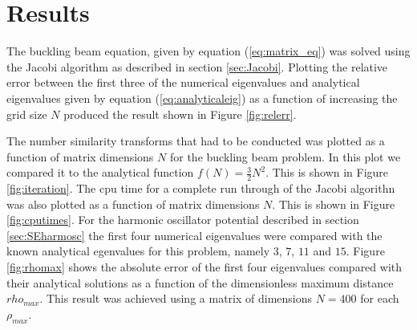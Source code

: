 \documentclass[twocolumn]{aastex62}
\begin{document}
\section{Results} \label{sec:results}
The buckling beam equation, given by equation (\ref{eq:matrix_eq}) was solved using the Jacobi algorithm as described in section \ref{sec:Jacobi}. Plotting the relative error between the first three of the numerical eigenvalues and analytical eigenvalues given by equation (\ref{eq:analyticaleig}) as a function of increasing the grid size $N$ produced the result shown in Figure \ref{fig:relerr}.
\begin{figure*}[h]
	\caption{Figure showing the relative error between the numerical and analytical eigenvalues given by equation \ref{eq:analyticaleig} for the buckling beam problem given by \ref{eq:matrix_eq}. }
	\label{fig:relerr}
\end{figure*}
\begin{figure*}[h]
	\caption{Figure showing the number of similarity transforms conducted before the off-diagonal elements are set below a tolerance when solving the buckling beam problem using the Jacobi algorithm.}
	\label{fig:iteration}
\end{figure*}
\begin{figure*}[h]
	\caption{Figure showing the CPU time as a function of matrix dimension $N$ when solving the buckling beam problem with the jacobi algorithm. The data is compared with the analytical function $f(N)=\frac{3}{2}N^2$.}
	\label{fig:cputimes}
\end{figure*}
The number similarity transforms that had to be conducted was plotted as a function of matrix dimensions $N$ for the buckling beam problem. In this plot we compared it to the analytical function $f(N)=\frac{3}{2}N^2$. This is shown in Figure \ref{fig:iteration}. The cpu time for a complete run through of the Jacobi algorithn was also plotted as a function of matrix dimensions $N$.  This is shown in Figure \ref{fig:cputimes}. For the harmonic oscillator potential described in section \ref{sec:SEharmosc} the first four numerical eigenvalues were compared with the known analytical egenvalues for this problem, namely $3$, $7$, $11$ and $15$. Figure \ref{fig:rhomax} shows the absolute error of the first four eigenvalues compared with their analytical solutions as a function of the dimensionless maximum distance $rho_{max}$. This result was achieved using a matrix of dimensions $N=400$ for each $\rho_{max}$.\\\indent
\end{document}
